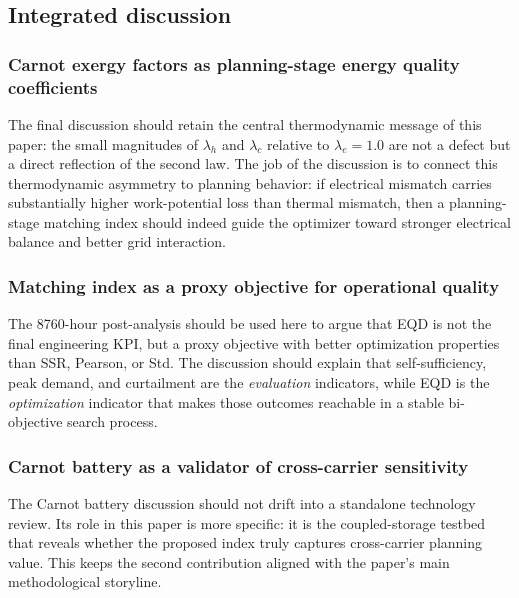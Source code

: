
\subsection{Integrated discussion}
\label{sec:discussion}

\subsubsection{Carnot exergy factors as planning-stage energy quality coefficients}

The final discussion should retain the central thermodynamic message of this paper: the small magnitudes of $\lambda_h$ and $\lambda_c$ relative to $\lambda_e = 1.0$ are not a defect but a direct reflection of the second law. The job of the discussion is to connect this thermodynamic asymmetry to planning behavior: if electrical mismatch carries substantially higher work-potential loss than thermal mismatch, then a planning-stage matching index should indeed guide the optimizer toward stronger electrical balance and better grid interaction.

\subsubsection{Matching index as a proxy objective for operational quality}

The 8760-hour post-analysis should be used here to argue that EQD is not the final engineering KPI, but a proxy objective with better optimization properties than SSR, Pearson, or Std. The discussion should explain that self-sufficiency, peak demand, and curtailment are the \emph{evaluation} indicators, while EQD is the \emph{optimization} indicator that makes those outcomes reachable in a stable bi-objective search process.

\subsubsection{Carnot battery as a validator of cross-carrier sensitivity}

The Carnot battery discussion should not drift into a standalone technology review. Its role in this paper is more specific: it is the coupled-storage testbed that reveals whether the proposed index truly captures cross-carrier planning value. This keeps the second contribution aligned with the paper's main methodological storyline.

